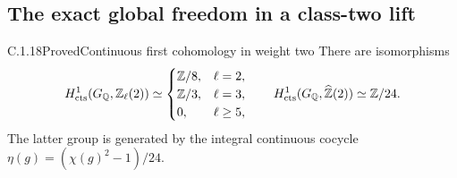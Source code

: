 \subsection{The exact global freedom in a class-two lift}
\label{sec:ghost-h1-weight2}

\begin{result}{C.1.18}{Proved}{Continuous first cohomology in weight two}
\label{prop:ghost-h1-weight2}
There are isomorphisms
\[
 H^1_{\rm cts}(G_{\mathbb Q},\mathbb Z_\ell(2))
 \simeq
 \begin{cases}
  \mathbb Z/8,&\ell=2,\\
  \mathbb Z/3,&\ell=3,\\
  0,&\ell\ge5,
 \end{cases}
 \qquad
 H^1_{\rm cts}(G_{\mathbb Q},\widehat{\mathbb Z}(2))
       \simeq\mathbb Z/24.
\]
The latter group is generated by the integral continuous
cocycle \(\eta(g)=(\chi(g)^2-1)/24\).
\end{result}
